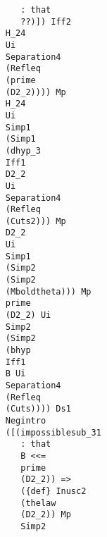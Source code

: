 \documentclass[12pt]{article}
\begin{document}
\begin{verbatim}
                                                    : that 
                                                    ??)]) Iff2 
                                                 H_24 
                                                 Ui 
                                                 Separation4 
                                                 (Refleq 
                                                 (prime 
                                                 (D2_2)))) Mp 
                                                 H_24 
                                                 Ui 
                                                 Simp1 
                                                 (Simp1 
                                                 (dhyp_3 
                                                 Iff1 
                                                 D2_2 
                                                 Ui 
                                                 Separation4 
                                                 (Refleq 
                                                 (Cuts2))) Mp 
                                                 D2_2 
                                                 Ui 
                                                 Simp1 
                                                 (Simp2 
                                                 (Simp2 
                                                 (Mboldtheta))) Mp 
                                                 prime 
                                                 (D2_2) Ui 
                                                 Simp2 
                                                 (Simp2 
                                                 (bhyp 
                                                 Iff1 
                                                 B Ui 
                                                 Separation4 
                                                 (Refleq 
                                                 (Cuts)))) Ds1 
                                                 Negintro 
                                                 ([(impossiblesub_31 
                                                    : that 
                                                    B <<= 
                                                    prime 
                                                    (D2_2)) => 
                                                    ({def} Inusc2 
                                                    (thelaw 
                                                    (D2_2)) Mp 
                                                    Simp2 

\end{verbatim}
\end{document}
